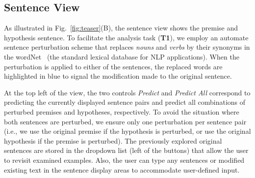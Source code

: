 
\subsection{Sentence View}
\label{sec:sentence}
As illustrated in Fig.~\ref{fig:teaser}(B), the sentence view shows the premise and hypothesis sentence.
%
To facilitate the analysis task (\textbf{T1}), we employ an automate sentence perturbation scheme that replaces \emph{nouns} and \emph{verbs} by their synonyms in the wordNet~\cite{Miller1995} (the standard lexical database for NLP applications).
%
When the perturbation is applied to either of the sentences, the replaced words are highlighted in blue to signal the modification made to the original sentence.



At the top left of the view, the two controls \emph{Predict} and \emph{Predict All} correspond to predicting the currently displayed sentence pairs and predict all combinations of perturbed premises and hypotheses, respectively.
%
To avoid the situation where both sentences are perturbed, we ensure only one perturbation per sentence pair (i.e., we use the original premise if the hypothesis is perturbed, or use the original hypothesis if the premise is perturbed).
The previously explored original sentences are stored in the dropdown list (left of the buttons) that allow the user to revisit examined examples.
Also, the user can type any sentences or modified existing text in the sentence display areas to accommodate user-defined input.



